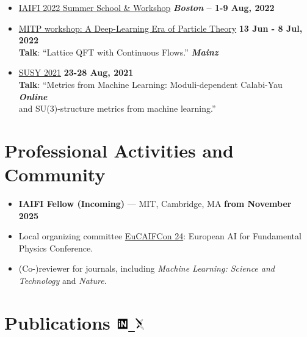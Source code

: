 \documentclass[11pt]{article}
\newcommand{\dateright}[1]{\hfill \textbf{#1}}
\begin{document}
\begin{itemize}[resume, itemsep=5pt]
    \item {\href{https://iaifi.org/past-workshops.html}{IAIFI 2022 Summer School \& Workshop}} \dateright{{\color{black}\textit{Boston} --} 1-9 Aug, 2022}

    \item {\href{https://indico.mitp.uni-mainz.de/event/254/overview}{MITP workshop: A Deep-Learning Era of Particle Theory}} \dateright{ 13 Jun - 8 Jul, 2022} \\
    {\footnotesize \textbf{Talk}: “Lattice QFT with Continuous Flows.”} \dateright{{\color{black}\textit{Mainz}}}

    \item {\href{https://indico.cern.ch/event/875077/contributions/4481976/}{SUSY 2021}} \dateright{ 23-28 Aug, 2021} \\
    {\footnotesize \textbf{Talk}: “Metrics from Machine Learning: Moduli-dependent Calabi-Yau} \dateright{{\color{black}\textit{Online}}}\\
    {\footnotesize and SU(3)-structure metrics from machine learning.”}


\end{itemize}


\section*{Professional Activities and Community}
\begin{itemize}[left=0pt, itemsep=3pt]
    \item \textbf{IAIFI Fellow (Incoming)} — MIT, Cambridge, MA \dateright{from November 2025}
    \item Local organizing committee \href{https://www.aanmelder.nl/eucaifcon24}{EuCAIFCon 24}: European AI for Fundamental Physics Conference.
    \item (Co-)reviewer for journals, including \textit{Machine Learning: Science and Technology} and \textit{Nature}.
\end{itemize}

\section*{Publications \hfill
{ \small
\href{https://inspirehep.net/authors/2107097}{\includegraphics[height=14pt]{inspire.pdf} \hspace*{-7pt} } \hspace*{10pt}
\href{https://arxiv.org/a/gerdes_m_1.html}{\includegraphics[height=14pt]{arxiv.pdf} \hspace*{-10pt} }
}
}
\end{document}
